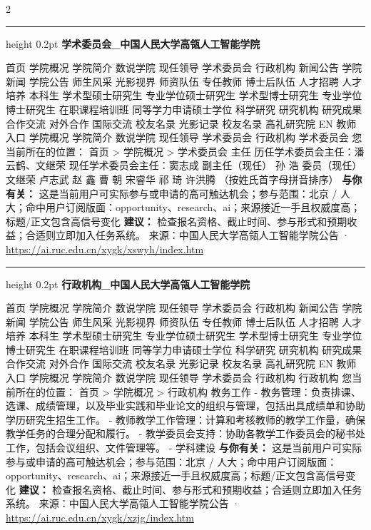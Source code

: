 \documentclass[10.5pt]{ctexart}
\begin{document}
\begin{multicols}{2}
\vspace{2mm}
\hrule height 0.2pt
\vspace{2mm}
{\large\bfseries 学术委员会\_中国人民大学高瓴人工智能学院}\par
首页 学院概况 学院简介 数说学院 现任领导 学术委员会 行政机构 新闻公告 学院新闻 学院公告 师生风采 光影视界 师资队伍 专任教师 博士后队伍 人才招聘 人才培养 本科生 学术型硕士研究生 专业学位硕士研究生 学术型博士研究生 专业学位博士研究生 在职课程培训班 同等学力申请硕士学位 科学研究 研究机构 研究成果 合作交流 对外合作 国际交流 校友名录 光影记录 校友名录 高礼研究院 EN 教师入口 学院概况 学院简介 数说学院 现任领导 学术委员会 行政机构 学术委员会 您当前所在的位置： 首页 > 学院概况 > 学术委员会 主任 历任学术委员会主任：潘云鹤、文继荣 现任学术委员会主任：窦志成 副主任（现任） 孙 浩 委员（现任） 文继荣 卢志武 赵 鑫 曹 朝 宋睿华 祁 琦 许洪腾 （按姓氏首字母拼音排序）
\textbf{与你有关：} 这是当前用户可实际参与或申请的高可触达机会；参与范围：北京 / 人大；命中用户订阅版面：opportunity、research、ai；来源接近一手且权威度高；标题/正文包含高信号变化
\textbf{建议：} 检查报名资格、截止时间、参与形式和预期收益；合适则立即加入任务系统。
{\footnotesize\color{ormuted} 来源：中国人民大学高瓴人工智能学院公告 · \url{https://ai.ruc.edu.cn/xygk/xswyh/index.htm}}
\vspace{2mm}
\hrule height 0.2pt
\vspace{2mm}
{\large\bfseries 行政机构\_中国人民大学高瓴人工智能学院}\par
首页 学院概况 学院简介 数说学院 现任领导 学术委员会 行政机构 新闻公告 学院新闻 学院公告 师生风采 光影视界 师资队伍 专任教师 博士后队伍 人才招聘 人才培养 本科生 学术型硕士研究生 专业学位硕士研究生 学术型博士研究生 专业学位博士研究生 在职课程培训班 同等学力申请硕士学位 科学研究 研究机构 研究成果 合作交流 对外合作 国际交流 校友名录 光影记录 校友名录 高礼研究院 EN 教师入口 学院概况 学院简介 数说学院 现任领导 学术委员会 行政机构 行政机构 您当前所在的位置： 首页 > 学院概况 > 行政机构 教务工作 - 教务管理：负责排课、选课、成绩管理，以及毕业实践和毕业论文的组织与管理，包括出具成绩单和协助学历研究生招生工作。 - 教师教学工作管理：计算和考核教师的教学工作量，确保教学任务的合理分配和履行。 - 教学委员会支持：协助各教学工作委员会的秘书处工作，包括会议组织、文件管理等。 - 学科建设
\textbf{与你有关：} 这是当前用户可实际参与或申请的高可触达机会；参与范围：北京 / 人大；命中用户订阅版面：opportunity、research、ai；来源接近一手且权威度高；标题/正文包含高信号变化
\textbf{建议：} 检查报名资格、截止时间、参与形式和预期收益；合适则立即加入任务系统。
{\footnotesize\color{ormuted} 来源：中国人民大学高瓴人工智能学院公告 · \url{https://ai.ruc.edu.cn/xygk/xzjg/index.htm}}
\end{multicols}
\end{document}
